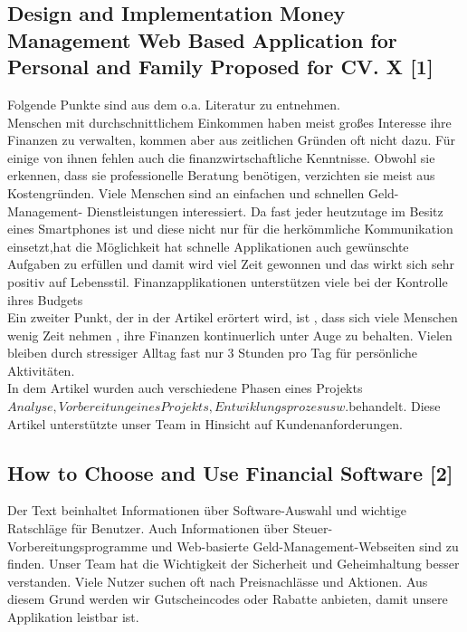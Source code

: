 \documentclass[runningheads,a4paper]{llncs}
\begin{document}
\subsection{Design and Implementation Money Management Web Based Application for Personal and Family Proposed for CV. X  [1]}
Folgende Punkte sind aus dem o.a. Literatur zu entnehmen. \\ Menschen mit durchschnittlichem Einkommen haben meist großes Interesse ihre Finanzen  zu verwalten, kommen aber aus zeitlichen Gründen oft nicht dazu. Für einige von ihnen fehlen auch die finanzwirtschaftliche Kenntnisse. Obwohl sie erkennen, dass sie professionelle Beratung benötigen, verzichten sie meist aus Kostengründen. Viele Menschen sind an einfachen und schnellen Geld- Management- Dienstleistungen interessiert. Da fast jeder heutzutage im Besitz eines Smartphones ist und diese nicht nur für die herkömmliche Kommunikation einsetzt,hat die Möglichkeit hat schnelle Applikationen auch gewünschte Aufgaben zu erfüllen und damit wird viel Zeit gewonnen und das wirkt sich sehr positiv auf Lebensstil. Finanzapplikationen unterstützen viele bei der Kontrolle ihres Budgets\\ Ein zweiter Punkt, der in der Artikel erörtert wird, ist , dass sich viele Menschen wenig Zeit nehmen , ihre Finanzen kontinuerlich unter Auge zu behalten. Vielen bleiben durch stressiger Alltag fast nur 3 Stunden pro Tag für persönliche Aktivitäten. \\  In dem Artikel wurden auch verschiedene Phasen eines Projekts \(Analyse, Vorbereitung eines Projekts, Entwiklungsprozes usw.\)behandelt. Diese Artikel unterstützte unser Team in Hinsicht auf Kundenanforderungen.

\subsection{How to Choose and Use Financial Software [2]}
Der Text beinhaltet Informationen über Software-Auswahl und wichtige Ratschläge für Benutzer. Auch Informationen über Steuer-Vorbereitungsprogramme und Web-basierte Geld-Management-Webseiten sind zu finden. 
 Unser Team hat die Wichtigkeit der Sicherheit und Geheimhaltung besser verstanden. Viele Nutzer suchen oft nach Preisnachlässe und Aktionen. Aus diesem Grund werden wir Gutscheincodes oder Rabatte anbieten, damit unsere Applikation leistbar ist.   
\end{document}
